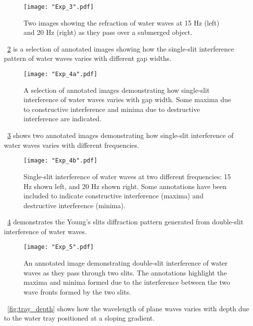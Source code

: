 \documentclass{article}
\newcommand{\figref}[2][\figurename~]{#1\ref{#2}}
\begin{document}
\begin{figure}[h]
\centering
\texttt{[image: "Exp\_3".pdf]}
\caption{Two images showing the refraction of water waves at 15 Hz (left) and 20 Hz (right) as they pass over a submerged object.}
\label{fig:refraction_image}
\end{figure}

\newpage
\vspace{2mm}
\noindent
\figref{fig:single_interference1} is a selection of annotated images showing how the single-slit interference pattern of water waves varies with different gap widths.

\begin{figure}[h]
\centering
\texttt{[image: "Exp\_4a".pdf]}
\caption{A selection of annotated images demonstrating how single-slit interference of water waves varies with gap width. Some maxima due to constructive interference and minima due to destructive interference are indicated.}
\label{fig:single_interference1}
\end{figure}

\vspace{2mm}
\noindent
\figref{fig:single_interference2} shows two annotated images demonstrating how single-slit interference of water waves varies with different frequencies. 

\begin{figure}[h]
\centering
\texttt{[image: "Exp\_4b".pdf]}
\caption{Single-slit interference of water waves at two different frequencies: 15 Hz shown left, and 20 Hz shown right. Some annotations have been included to indicate constructive interference (maxima) and destructive interference (minima).}
\label{fig:single_interference2}
\end{figure}

\newpage
\vspace{2mm}
\noindent
\figref{fig:double_interference} demonstrates the Young's slits diffraction pattern generated from double-slit interference of water waves.

\begin{figure}[h]
\centering
\texttt{[image: "Exp\_5".pdf]}
\caption{An annotated image demonstrating double-slit interference of water waves as they pass through two slits. The annotations highlight the maxima and minima formed due to the interference between the two wave fronts formed by the two slits.}
\label{fig:double_interference}
\end{figure}

\newpage
\vspace{2mm}
\noindent
\figref{fig:tray_depth} shows how the wavelength of plane waves varies with depth due to the water tray positioned at a sloping gradient.
\end{document}
